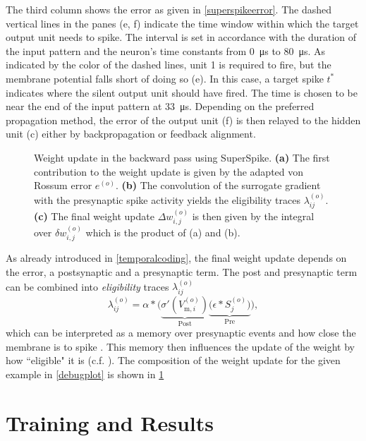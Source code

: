The third column shows the error as given in \cref{superspikeerror}. The dashed vertical lines in the panes (e, f) indicate the time window within which the target output unit needs to spike. The interval is set in accordance with the duration of the input pattern and the neuron's time constants from \SI{0}{\micro \s} to \SI{80}{\micro \s}. As indicated by the color of the dashed lines, unit 1 is required to fire, but the membrane potential falls short of doing so (e). In this case, a target spike $t^*$ indicates where the silent output unit should have fired. The time is chosen to be near the end of the input pattern at \SI{33}{\micro \s}. Depending on the preferred propagation method, the error of the output unit (f) is then relayed to the hidden unit (c) either by backpropagation or feedback alignment.

\begin{figure}
	\centering
	
	\caption[Weight update in the backward pass using SuperSpike.]{Weight update in the backward pass using SuperSpike. \textbf{(a)} The first contribution to the weight update is given by the adapted von Rossum error $e^{(o)}$. \textbf{(b)} The convolution of the surrogate gradient with the presynaptic spike activity yields the eligibility traces $\lambda_{ij}^{(o)}$. \textbf{(c)} The final weight update $\Delta w_{i,j}^{(o)}$ is then given by the integral over $\delta w_{i,j}^{(o)}$ which is the product of (a) and (b).}
	\label{weightchangesplot}
\end{figure}

As already introduced in \cref{temporalcoding}, the final weight update depends on the error, a postsynaptic and a presynaptic term. The post and presynaptic term can be combined into \emph{eligibility} traces $\lambda_{ij}^{(o)}$
\begin{equation*}
\lambda_{ij}^{(o)} = \alpha \ast 
\Big(\underbrace{\sigma'(V^{(o)}_{\text{m},i})}_{\text{Post}} 
\underbrace{\big(\epsilon \ast S_j^{(o)}\big)}_{\text{Pre}}\Big),
\end{equation*}
which can be interpreted as a memory over presynaptic events and how close the membrane is to spike . This memory then influences the update of the weight by how ``eligible" it is (c.f. \citealp{sutton2011reinforcement}). The composition of the weight update for the given example in \cref{debugplot} is shown in \cref{weightchangesplot}

\section{Training and Results}

